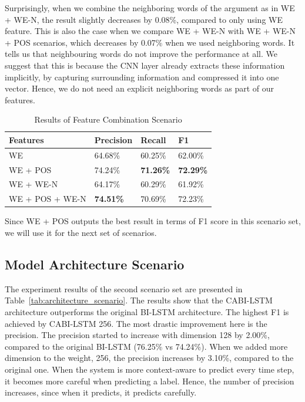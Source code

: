 Surprisingly, when we combine the neighboring words of the argument as in WE + WE-N, the result slightly decreases by 0.08\%, compared to only using WE feature. This is also the case when we compare WE + WE-N with WE + WE-N + POS scenarios, which decreases by 0.07\% when we used neighboring words. It tells us that neighbouring words do not improve the performance at all. We suggest that this is because the CNN layer already extracts these information implicitly, by capturing surrounding information and compressed it into one vector. Hence, we do not need an explicit neighboring words as part of our features. 

\begin{table}
	\caption{Results of Feature Combination Scenario}
	\label{tab:feature_scenario}
	\begin{tabular}{llll}
		\toprule
		Features		&Precision	&Recall		&F1			\\
		\midrule
		WE				&	64.68\%				&	60.25\%				&	62.00\%	\\
		WE + POS		&	74.24\%				&	\textbf{71.26\%}	&	\textbf{72.29\%}	\\
		WE + WE-N		&	64.17\%				&	60.29\%				&	61.92\%	\\
		WE + POS + WE-N	&	\textbf{74.51\%}	&	70.69\%				&	72.23\%	\\
		\bottomrule
	\end{tabular}
\end{table}

Since WE + POS outputs the best result in terms of F1 score in this scenario set, we will use it for the next set of scenarios.

\subsection{Model Architecture Scenario}
The experiment results of the second scenario set are presented in Table~\ref{tab:architecture_scenario}. The results show that the CABI-LSTM architecture outperforms the original BI-LSTM architecture. The highest F1 is achieved by CABI-LSTM 256. The most drastic improvement here is the precision. The precision started to increase with dimension 128 by 2.00\%, compared to the original BI-LSTM (76.25\% vs 74.24\%). When we added more dimension to the weight, 256, the precision increases by 3.10\%, compared to the original one. When the system is more context-aware to predict every time step, it becomes more careful when predicting a label. Hence, the number of precision increases, since when it predicts, it predicts carefully. 

